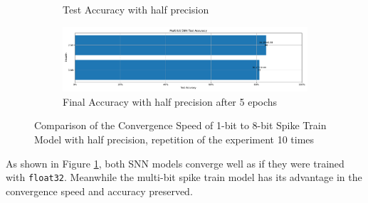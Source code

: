 \begin{figure}[!htpb]
\begin{subfigure}[H]{0.48\textwidth}
            \caption{Test Accuracy with half precision}
        \end{subfigure}
        \hfill
        \begin{subfigure}[H]{\textwidth}
            \centering
            \includegraphics[width=\textwidth]{../bf16/FashionMNIST/plots/fashionmnist_final_acc.pdf}
            \caption{Final Accuracy with half precision after 5 epochs}
        \end{subfigure}
        \caption{Comparison of the Convergence Speed of 1-bit to 8-bit Spike Train Model with half precision, repetition of the experiment 10 times}
        \label{fig:half_precision}
    \end{figure}

    As shown in Figure \ref{fig:half_precision}, both SNN models converge well as if they were trained with \verb|float32|. Meanwhile the multi-bit spike train model has its advantage in the convergence speed and accuracy preserved. 
    
